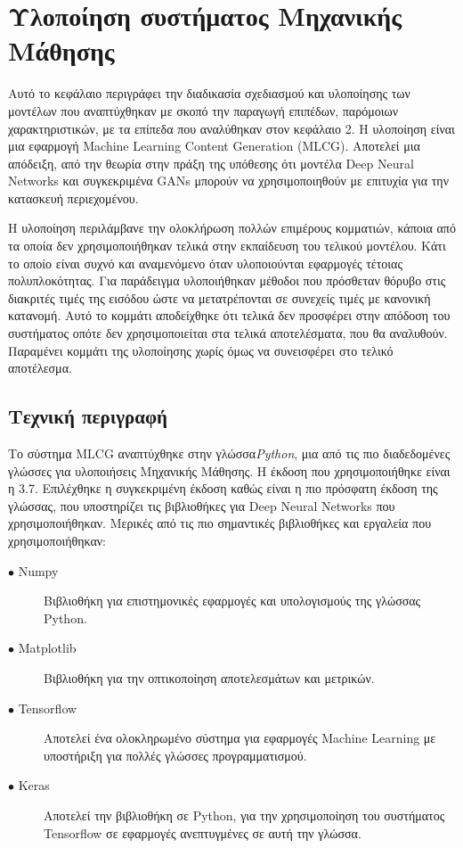 \chapter{Υλοποίηση συστήματος Μηχανικής Μάθησης}

Αυτό το κεφάλαιο περιγράφει την διαδικασία σχεδιασμού και υλοποίησης των μοντέλων που αναπτύχθηκαν με σκοπό την παραγωγή επιπέδων, παρόμοιων χαρακτηριστικών, με τα επίπεδα που αναλύθηκαν στον κεφάλαιο 2. Η υλοποίηση είναι μια εφαρμογή Machine Learning Content Generation (MLCG). Αποτελεί μια απόδειξη, από την θεωρία στην πράξη της υπόθεσης ότι μοντέλα Deep Neural Networks και συγκεκριμένα GANs μπορούν να χρησιμοποιηθούν με επιτυχία για την κατασκευή περιεχομένου.
\par
Η υλοποίηση περιλάμβανε την ολοκλήρωση πολλών επιμέρους κομματιών, κάποια από τα οποία δεν χρησιμοποιήθηκαν τελικά στην εκπαίδευση του τελικού μοντέλου. Κάτι το οποίο είναι συχνό και αναμενόμενο όταν υλοποιούνται εφαρμογές τέτοιας πολυπλοκότητας. Για παράδειγμα υλοποιήθηκαν μέθοδοι που πρόσθεταν θόρυβο στις διακριτές τιμές της εισόδου ώστε να μετατρέπονται σε συνεχείς τιμές με κανονική κατανομή. Αυτό το κομμάτι αποδείχθηκε ότι τελικά δεν προσφέρει στην απόδοση του συστήματος οπότε δεν χρησιμοποιείται στα τελικά αποτελέσματα, που θα αναλυθούν. Παραμένει κομμάτι της υλοποίησης χωρίς όμως να συνεισφέρει στο τελικό αποτέλεσμα.

\section{Τεχνική περιγραφή}
Το σύστημα MLCG αναπτύχθηκε στην γλώσσα\textit{Python}, μια από τις πιο διαδεδομένες γλώσσες για υλοποιήσεις Μηχανικής Μάθησης. Η έκδοση που χρησιμοποιήθηκε είναι η 3.7. Επιλέχθηκε η συγκεκριμένη έκδοση καθώς είναι η πιο πρόσφατη έκδοση της γλώσσας, που υποστηρίζει τις βιβλιοθήκες για Deep Neural Networks που χρησιμοποιήθηκαν. 
Μερικές από τις πιο σημαντικές βιβλιοθήκες και εργαλεία που χρησιμοποιήθηκαν:

\begin{description}
\item[$\bullet$ Numpy] Βιβλιοθήκη για επιστημονικές εφαρμογές και υπολογισμούς της γλώσσας Python.
\item[$\bullet$ Matplotlib] Βιβλιοθήκη για την οπτικοποίηση αποτελεσμάτων και μετρικών.
\item[$\bullet$ Tensorflow] Αποτελεί ένα ολοκληρωμένο σύστημα για εφαρμογές Machine Learning με υποστήριξη για πολλές γλώσσες προγραμματισμού. 
\item[$\bullet$ Keras] Αποτελεί την βιβλιοθήκη σε Python, για την χρησιμοποίηση του συστήματος Tensorflow σε εφαρμογές ανεπτυγμένες σε αυτή την γλώσσα.
\end{description}


